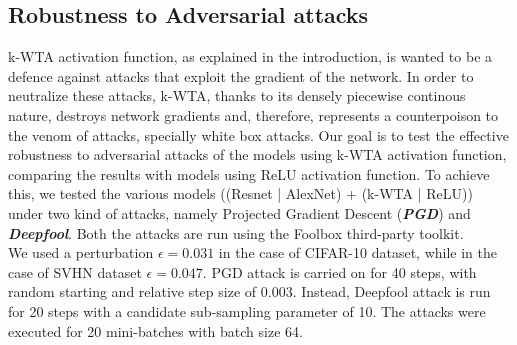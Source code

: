 \documentclass[a4paper]{article}
\begin{document}
	\subsection{Robustness to Adversarial attacks}
	k-WTA activation function, as explained in the introduction, is wanted to be a defence against attacks that exploit the gradient of the network. In order to neutralize these attacks, k-WTA, thanks to its densely piecewise continous nature, destroys network gradients and, therefore, represents a counterpoison to the venom of attacks, specially white box attacks. Our goal is to test the effective robustness to adversarial attacks of the models using k-WTA activation function, comparing the results with models using ReLU activation function. To achieve this, we tested the various models ((Resnet | AlexNet) + (k-WTA | ReLU)) under two kind of attacks, namely Projected Gradient Descent (\textbf{\textit{PGD}}) and \textbf{\textit{Deepfool}}. Both the attacks are run using the Foolbox third-party toolkit.\\
	We used a perturbation $\epsilon = 0.031$ in the case of CIFAR-10 dataset, while in the case of SVHN dataset $\epsilon = 0.047$. PGD attack is carried on for 40 steps, with random starting and relative step size of $0.003$. Instead, Deepfool attack is run for 20 steps with a candidate sub-sampling parameter of 10. The attacks were executed for 20 mini-batches with batch size 64.
	
\end{document}

